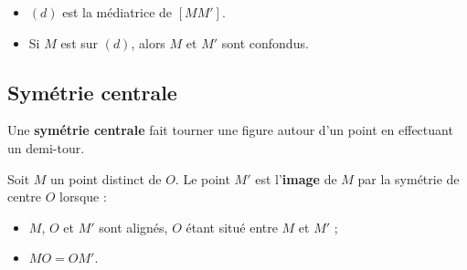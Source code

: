 \begin{rem}
	\nline
	\begin{itemize}
		\item $(d)$ est la médiatrice de $[MM']$.
		\item Si $M$ est sur $(d)$, alors $M$ et $M'$ sont confondus.
	\end{itemize}
\end{rem}

\subsection{Symétrie centrale}

\begin{defin}
	Une \textbf{symétrie centrale} fait tourner une figure autour d'un point en effectuant un demi-tour.

	Soit $M$ un point distinct de $O$. Le point $M'$ est l'\textbf{image} de $M$ par la symétrie de centre $O$ lorsque :

	\begin{itemize}
		\item $M$, $O$ et $M'$ sont alignés, $O$ étant situé entre $M$ et $M'$ ;
		\item $MO = OM'$.
	\end{itemize}
\end{defin}

